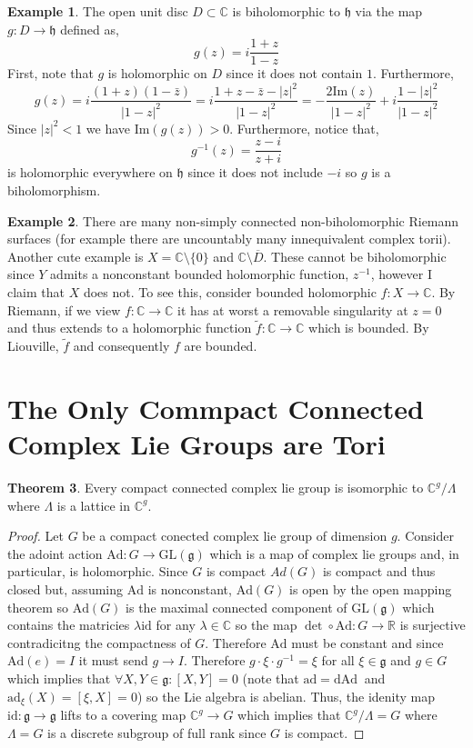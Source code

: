 \documentclass[12pt]{extarticle}
\newcommand{\R}{\mathbb{R}}
\newcommand{\id}{\mathrm{id}}
\renewcommand{\Im}[1]{\mathrm{Im}(#1)}
\renewcommand{\d}[1]{ \mathrm{d}#1 \:}
\theoremstyle{definition}
\newtheorem{theorem}{Theorem}[section]
\newtheorem{example}[theorem]{Example}
\newcommand{\GL}[1]{\mathrm{GL}\left(#1\right)}
\newcommand{\g}{\mathfrak{g}}
\newcommand{\h}{\mathfrak{h}}
\newcommand{\C}{\mathbb{C}}
\begin{document}
\begin{example}
The open unit disc $D \subset \C$ is biholomorphic to $\h$ via the map $g : D \to \h$ defined as,
\[ g(z) = i \frac{1 + z}{1 - z} \]
First, note that $g$ is holomorphic on $D$ since it does not contain $1$. Furthermore, 
\[ g(z) = i \frac{(1 + z)(1 - \bar{z})}{|1 - z|^2} = i \frac{1 + z - \bar{z} - |z|^2}{|1 - z|^2} = - \frac{2 \Im{z}}{|1 - z|^2} + i \frac{1 - |z|^2}{|1 - z|^2} \]
Since $|z|^2 < 1$ we have $\Im{g(z)} > 0$. Furthermore, notice that,
\[ g^{-1}(z) = \frac{z - i}{z + i} \] 
is holomorphic everywhere on $\h$ since it does not include $-i$ so $g$ is a biholomorphism. 
\end{example}

\begin{example}
There are many non-simply connected non-biholomorphic Riemann surfaces (for example there are uncountably many innequivalent complex torii). Another cute example is $X = \C \setminus \{ 0 \}$ and $\C \setminus \overline{D}$. These cannot be biholomorphic since $Y$ admits a nonconstant bounded holomorphic function, $z^{-1}$, however I claim that $X$ does not. To see this, consider bounded holomorphic $f : X \to \C$. By Riemann, if we view $f : \C \to \C$ it has at worst a removable singularity at $z = 0$ and thus extends to a holomorphic function $\tilde{f} : \C \to \C$ which is bounded. By Liouville, $\tilde{f}$ and consequently $f$ are bounded. 
\end{example}

\section{The Only Commpact Connected Complex Lie Groups are Tori}

\begin{theorem}
Every compact connected complex lie group is isomorphic to $\C^g / \Lambda$ where $\Lambda$ is a lattice in $\C^g$. 
\end{theorem}

\newcommand{\Ad}{\mathrm{Ad}}

\begin{proof}
Let $G$ be a compact conected complex lie group of dimension $g$. Consider the adoint action $\Ad : G \to \GL{\g}$ which is a map of complex lie groups and, in particular, is holomorphic. Since $G$ is compact $Ad(G)$ is compact and thus closed but, assuming $\Ad$ is nonconstant, $\Ad(G)$ is open by the open mapping theorem so $\Ad(G)$ is the maximal connected component of $\GL{\g}$ which contains the matricies $\lambda \id$ for any $\lambda \in \C$ so the map $\det \circ \Ad : G \to \R$ is surjective contradicitng the compactness of $G$. Therefore $\Ad$ must be constant and since $\Ad(e) = I$ it must send $g \to I$. Therefore $g \cdot \xi \cdot g^{-1} = \xi$ for all $\xi \in \g$ and $g \in G$ which implies that $\forall X, Y \in \g : [X, Y] = 0$ (note that $\mathrm{ad} = \d{\Ad}$ and $\mathrm{ad}_\xi(X) = [\xi, X] = 0$) so the Lie algebra is abelian. Thus, the idenity map $\id : \g \to \g$ lifts to a covering map $\C^g \to G$ which implies that $\C^g / \Lambda = G$ where $\Lambda = G$ is a discrete subgroup of full rank since $G$ is compact. 
\end{proof}
\end{document}
